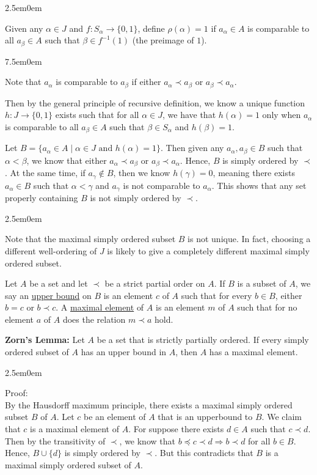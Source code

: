 \documentclass{book}
\newcommand{\hTwo}{%
\color{Black}%
   \fontsize{13}{15}\selectfont%
}
\newcommand{\myComment}{%
   \color{RawerSienna}%
   \fontsize{12}{14}\selectfont%
}
\newenvironment{myIndent}{%
   \begin{adjustwidth}{2.5em}{0em}%
}{%
   \end{adjustwidth}%
}
\newenvironment{myTindent}{%
   \begin{adjustwidth}{7.5em}{0em}%
}{%
   \end{adjustwidth}%
}
\newcommand{\udefine}[1]{{%
   \setulcolor{Red}%
   \setul{0.14em}{0.07em}%
   \ul{#1}%
}}
\newcommand{\blab}[1]{\textbf{#1}}
\newcommand{\retTwo}{\hfill\bigbreak}
\begin{document}
\begin{myIndent}
      Given any $\alpha \in J$ and $f: S_\alpha \longrightarrow \{0, 1\}$, define $\rho(\alpha) = 1$ if $a_\alpha \in A$ is comparable to all $a_\beta \in A$ such that $\beta \in f^{-1}(1)$ (the preimage of $1$).
      \begin{myTindent}\myComment
         Note that $a_\alpha$ is comparable to $a_\beta$ if either $a_\alpha \prec a_\beta$ or $a_\beta \prec a_\alpha$.\newpage
      \end{myTindent}

      Then by the general principle of recursive definition, we know a unique function $h: J \longrightarrow \{0, 1\}$ exists such that for all $\alpha \in J$, we have that $h(\alpha) = 1$ only when $a_\alpha$ is comparable to all $a_\beta \in A$ such that $\beta \in S_\alpha$ and $h(\beta) = 1$.\retTwo

      Let $B = \{a_\alpha \in A \mid \alpha \in J \text{ and } h(\alpha) = 1\}$. Then given any $a_\alpha, a_\beta \in B$ such that $\alpha < \beta$, we know that either $a_\alpha \prec a_\beta$ or $a_\beta \prec a_\alpha$. Hence, $B$ is simply ordered by $\prec$. At the same time, if $a_\gamma \notin B$, then we know $h(\gamma) = 0$, meaning there exists $a_\alpha \in B$ such that $\alpha < \gamma$ and  $a_\gamma$ is not comparable to $a_\alpha$. This shows that any set properly containing $B$ is not simply ordered by $\prec$.

      
      \begin{myIndent}\myComment
         Note that the maximal simply ordered subset $B$ is not unique. In fact, choosing a different well-ordering of $J$ is likely to give a completely different maximal simply ordered subset.\retTwo\retTwo
      \end{myIndent}
   \end{myIndent}

   Let $A$ be a set and let $\prec$ be a strict partial order on $A$. If $B$ is a subset of $A$, we say an \udefine{upper bound} on $B$ is an element $c$ of $A$ such that for every $b \in B$, either $b = c$ or $b \prec c$. A \udefine{maximal element} of $A$ is an element $m$ of $A$ such that for no element $a$ of $A$ does the relation $m \prec a$ hold.\retTwo

   \blab{Zorn's Lemma:} Let $A$ be a set that is strictly partially ordered. If every simply ordered subset of $A$ has an upper bound in $A$, then $A$ has a maximal element.

   \begin{myIndent}\hTwo
      Proof:\\
      By the Hausdorff maximum principle, there exists a maximal simply ordered subset $B$ of $A$. Let $c$ be an element of $A$ that is an upperbound to $B$. We claim that $c$ is a maximal element of $A$. For suppose there exists $d \in A$ such that $c \prec d$. Then by the transitivity of $\prec$, we know that $b \preceq c \prec d \Longrightarrow b \prec d$ for all $b \in B$. Hence, $B \cup \{d\}$ is simply ordered by $\prec$. But this contradicts that $B$ is a maximal simply ordered subset of $A$.\retTwo\retTwo
   \end{myIndent}
\end{document}
